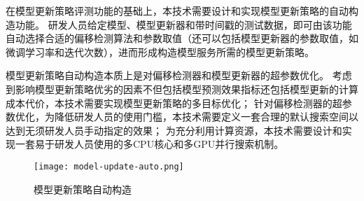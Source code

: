 在模型更新策略评测功能的基础上，本技术需要设计和实现模型更新策略的自动构造功能。
研发人员给定模型、模型更新器和带时间戳的测试数据，即可由该功能自动选择合适的偏移检测算法和参数取值（还可以包括模型更新器的参数取值，如微调学习率和迭代次数），进而形成构造模型服务所需的模型更新策略。

模型更新策略自动构造本质上是对偏移检测器和模型更新器的超参数优化。
考虑到影响模型更新策略优劣的因素不但包括模型预测效果指标还包括模型更新的计算成本代价，本技术需要实现模型更新策略的多目标优化；
针对偏移检测器的超参数优化，为降低研发人员的使用门槛，本技术需要定义一套合理的默认搜索空间以达到无须研发人员手动指定的效果；
为充分利用计算资源，本技术需要设计和实现一套易于研发人员使用的多CPU核心和多GPU并行搜索机制。

\begin{figure}
  \centering
  \texttt{[image: model-update-auto.png]}
  \caption{模型更新策略自动构造}
  \label{fig:automodelupdate}
\end{figure}
